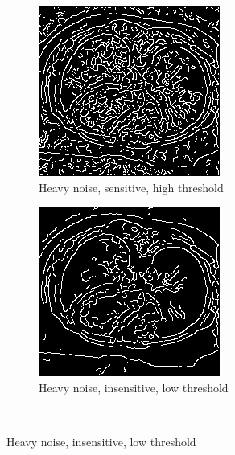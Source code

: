 \begin{figure}[H]
  \begin{subfigure}{.5\textwidth}
    \centering
    \includegraphics[width=.9\textwidth]{./edgedetection/heavy_noise/h_noise_sens_h_thres}
    \caption{Heavy noise, sensitive, high threshold}
    \label{fig:h_noise_sens_h_thres}
  \end{subfigure}%
  
  \begin{subfigure}{.5\textwidth}
    \centering
    \includegraphics[width=.9\textwidth]{./edgedetection/heavy_noise/h_noise_insens_l_thres}
    \caption{Heavy noise, insensitive, low threshold}
    \label{fig:h_noise_insens_l_thres}
  \end{subfigure}\\%
  

\end{figure}
